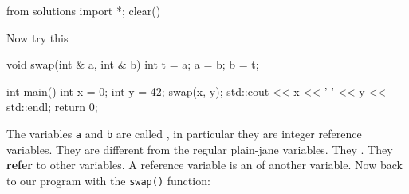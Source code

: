 \begin{python0}
from solutions import *; clear()
\end{python0}

Now try this

\begin{consolethree}[escapeinside=||]
void swap(int & a, int & b)
{
    int t = a;
    a = b;
    b = t;
}

int main()
{
    int x = 0;
    int y = 42;
    swap(x, y);
    std::cout << x << ' ' << y << std::endl;
    return 0;
}
\end{consolethree}

The variables \texttt{a} and \texttt{b} are called , in particular they are integer reference variables. They are different from the regular plain-jane variables. They . They \textbf{refer} to other variables. A reference variable is an  of another variable.
\newpage
Now back to our program with the \texttt{swap()} function:

